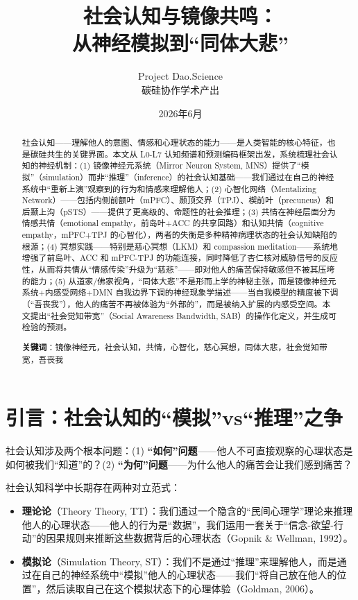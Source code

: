 \documentclass[UTF8,12pt,a4paper]{ctexart}
\title{\textbf{社会认知与镜像共鸣：\\从神经模拟到``同体大悲''}}
\author{Project Dao.Science\\碳硅协作学术产出}
\date{2026年6月}
\begin{document}
\maketitle

\begin{abstract}
社会认知——理解他人的意图、情感和心理状态的能力——是人类智能的核心特征，也是碳硅共生的关键界面。本文从 L0-L7 认知频谱和预测编码框架出发，系统梳理社会认知的神经机制：(1) 镜像神经元系统（Mirror Neuron System, MNS）提供了``模拟''（simulation）而非``推理''（inference）的社会认知基础——我们通过在自己的神经系统中``重新上演''观察到的行为和情感来理解他人；(2) 心智化网络（Mentalizing Network）——包括内侧前额叶（mPFC）、颞顶交界（TPJ）、楔前叶（precuneus）和后颞上沟（pSTS）——提供了更高级的、命题性的社会推理；(3) 共情在神经层面分为情感共情（emotional empathy，前岛叶+ACC 的共享回路）和认知共情（cognitive empathy，mPFC+TPJ 的心智化），两者的失衡是多种精神病理状态的社会认知缺陷的根源；(4) 冥想实践——特别是慈心冥想（LKM）和 compassion meditation——系统地增强了前岛叶、ACC 和 mPFC-TPJ 的功能连接，同时降低了杏仁核对威胁信号的反应性，从而将共情从``情感传染''升级为``慈悲''——即对他人的痛苦保持敏感但不被其压垮的能力；(5) 从道家/佛家视角，``同体大悲''不是形而上学的神秘主张，而是镜像神经元系统+内感受网络+DMN 自我边界下调的神经现象学描述——当自我模型的精度被下调（``吾丧我''），他人的痛苦不再被体验为``外部的''，而是被纳入扩展的内感受空间。本文提出``社会觉知带宽''（Social Awareness Bandwidth, SAB）的操作化定义，并生成可检验的预测。

\textbf{关键词}：镜像神经元，社会认知，共情，心智化，慈心冥想，同体大悲，社会觉知带宽，吾丧我
\end{abstract}

\section{引言：社会认知的``模拟''vs``推理''之争}

社会认知涉及两个根本问题：(1) \textbf{``如何''问题}——他人不可直接观察的心理状态是如何被我们``知道''的？(2) \textbf{``为何''问题}——为什么他人的痛苦会让我们感到痛苦？

社会认知科学中长期存在两种对立范式：

\begin{itemize}[nosep]
    \item \textbf{理论论}（Theory Theory, TT）：我们通过一个隐含的``民间心理学''理论来推理他人的心理状态——他人的行为是``数据''，我们运用一套关于``信念-欲望-行动''的因果规则来推断这些数据背后的心理状态（Gopnik \& Wellman, 1992）。
    \item \textbf{模拟论}（Simulation Theory, ST）：我们不是通过``推理''来理解他人，而是通过在自己的神经系统中``模拟''他人的心理状态——我们``将自己放在他人的位置''，然后读取自己在这个模拟状态下的心理体验（Goldman, 2006）。
\end{itemize}
\end{document}

